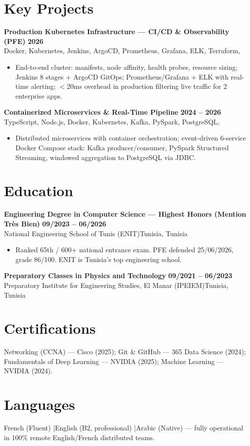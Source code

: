\documentclass[a4paper,9pt]{article}
\newcommand{\cventry}[4]{\textbf{#1} \hfill \textbf{#4}\\[0.3pt]#2{\ifx\relax#3\relax\else, #3\fi}\par\vspace{0.8pt}}
\begin{document}
\section{Key Projects}
\cventry{Production Kubernetes Infrastructure --- CI/CD \& Observability (PFE)}{Docker, Kubernetes, Jenkins, ArgoCD, Prometheus, Grafana, ELK, Terraform}{}{2026}
\begin{itemize}
  \item End-to-end cluster: manifests, node affinity, health probes, resource sizing; Jenkins 8 stages + ArgoCD GitOps; Prometheus/Grafana + ELK with real-time alerting; $<$20ms overhead in production filtering live traffic for 2 enterprise apps.
\end{itemize}
\cventry{Containerized Microservices \& Real-Time Pipeline}{TypeScript, Node.js, Docker, Kubernetes, Kafka, PySpark, PostgreSQL}{}{2024 -- 2026}
\begin{itemize}
  \item Distributed microservices with container orchestration; event-driven 6-service Docker Compose stack: Kafka producer/consumer, PySpark Structured Streaming, windowed aggregation to PostgreSQL via JDBC.
\end{itemize}

\section{Education}
\cventry{Engineering Degree in Computer Science --- Highest Honors (Mention Très Bien)}{National Engineering School of Tunis (ENIT)}{Tunisia}{09/2023 -- 06/2026}
\begin{itemize}
  \item Ranked 65th / 600+ national entrance exam. PFE defended 25/06/2026, grade 86/100. ENIT is Tunisia's top engineering school.
\end{itemize}
\cventry{Preparatory Classes in Physics and Technology}{Preparatory Institute for Engineering Studies, El Manar (IPEIEM)}{Tunisia}{09/2021 -- 06/2023}

\section{Certifications}
Networking (CCNA) --- Cisco (2025); Git \& GitHub --- 365 Data Science (2024); Fundamentals of Deep Learning --- NVIDIA (2025); Machine Learning --- NVIDIA (2024).

\section{Languages}
French (Fluent) \quad|\quad English (B2, professional) \quad|\quad Arabic (Native) — fully operational in 100\% remote English/French distributed teams.
\end{document}
